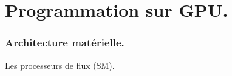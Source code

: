 \section{Programmation sur GPU.}
\begin{frame}
    \frametitle{Architecture matérielle.}
\begin{block}{Les processeurs de flux (SM).}
    
\end{block}
    

\end{frame}